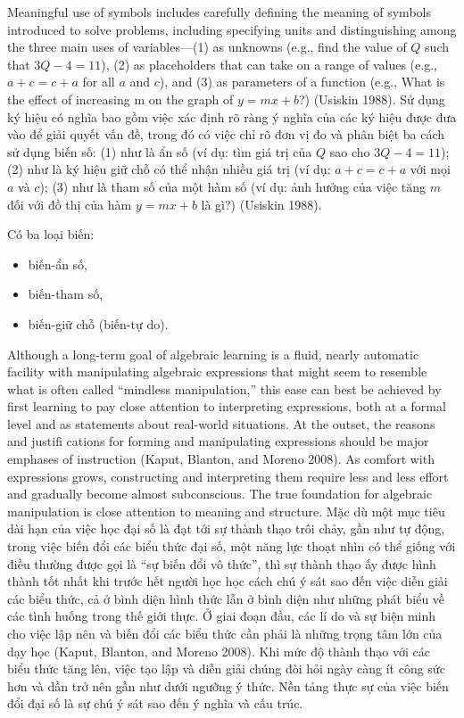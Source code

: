 \documentclass[
  10pt,
  a4paper,
  landscape,
  twoside,
  openany
]{scrbook}
\newcommand{\EN}[1]{#1}
\newcommand{\VI}[1]{#1}
\newcommand{\NOTE}[1]{#1}
\begin{document}
\TriPara
{
\EN{Meaningful use of symbols includes carefully defining the meaning of symbols introduced to solve problems, including specifying units and distinguishing among the three main uses of variables---(1) as unknowns (e.g., find the value of $Q$ such that $3Q - 4 = 11$), (2) as placeholders that can take on a range of values (e.g., $a + c = c + a$ for all $a$ and $c$), and (3) as parameters of a function (e.g., What is the effect of increasing m on the graph of $y = mx + b$?) (Usiskin 1988).}
}
{
\VI{Sử dụng ký hiệu có nghĩa bao gồm việc xác định rõ ràng ý nghĩa của các ký hiệu được đưa vào để giải quyết vấn đề, trong đó có việc chỉ rõ đơn vị đo và phân biệt ba cách sử dụng biến số: (1) như là ẩn số (ví dụ: tìm giá trị của $Q$ sao cho $3Q - 4 = 11$); (2) như là ký hiệu giữ chỗ có thể nhận nhiều giá trị (ví dụ: $a + c = c + a$ với mọi $a$ và $c$); (3) như là tham số của một hàm số (ví dụ: ảnh hưởng của việc tăng $m$ đối với đồ thị của hàm $y = mx + b$ là gì?) (Usiskin 1988).}
}
{
\NOTE{Có ba loại biến: 

\begin{itemize}
  \item biến-ẩn số,
  \item biến-tham số,
  \item biến-giữ chỗ (biến-tự do).
\end{itemize}
}
}

\TriPara
{
\EN{Although a long-term goal of algebraic learning is a fluid, nearly automatic facility with manipulating algebraic expressions that might seem to resemble what is often called ``mindless manipulation,'' this ease can best be achieved by first learning to pay close attention to interpreting expressions, both at a formal level and as statements about real-world situations. At the outset, the reasons and justifi cations for forming and manipulating expressions should be major emphases of instruction (Kaput, Blanton, and Moreno 2008). As comfort with expressions grows, constructing and interpreting them require less and less effort and gradually become almost subconscious. The true foundation for algebraic manipulation is close attention to meaning and structure.}
}
{
\VI{Mặc dù một mục tiêu dài hạn của việc học đại số là đạt tới sự thành thạo trôi chảy, gần như tự động, trong việc biến đổi các biểu thức đại số, một năng lực thoạt nhìn có thể giống với điều thường được gọi là ``sự biến đổi vô thức'', thì sự thành thạo ấy được hình thành tốt nhất khi trước hết người học học cách chú ý sát sao đến việc diễn giải các biểu thức, cả ở bình diện hình thức lẫn ở bình diện như những phát biểu về các tình huống trong thế giới thực. Ở giai đoạn đầu, các lí do và sự biện minh cho việc lập nên và biến đổi các biểu thức cần phải là những trọng tâm lớn của dạy học (Kaput, Blanton, and Moreno 2008). Khi mức độ thành thạo với các biểu thức tăng lên, việc tạo lập và diễn giải chúng đòi hỏi ngày càng ít công sức hơn và dần trở nên gần như dưới ngưỡng ý thức. Nền tảng thực sự của việc biến đổi đại số là sự chú ý sát sao đến ý nghĩa và cấu trúc.}
}
{
\NOTE{}
}
\end{document}
